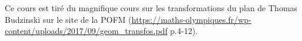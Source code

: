 Ce cours est tiré du magnifique cours sur les transformations du plan de Thomas Budzinski sur le site de la POFM (\url{https://maths-olympiques.fr/wp-content/uploads/2017/09/geom_transfos.pdf} p.4-12).